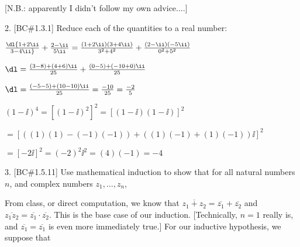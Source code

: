 \ssk

\item{} [N.B.: apparently I didn't follow my own advice....]

\bsk

\item{2.} [BC\#1.3.1] Reduce each of the quantities to a real number:

\msk


\msk

\item{} $\dl {{1+2\ii}\over{3-4\ii}}+{{2-\ii}\over{5\ii}} = 
{{(1+2\ii)(3+4\ii)}\over{3^2+4^2}}+{{(2-\ii)(-5\ii)}\over{0^2+5^2}}$

$\dl = 
{{(3-8)+(4+6)\ii}\over{25}}+{{(0-5)+(-10+0)\ii}\over{25}}$

$\dl = 
{{(-5-5)+(10-10)\ii}\over{25}} = {{-10}\over{25}} = {{-2}\over{5}}$

\msk

\item{} $(1-\ii)^4 = [(1-\ii)^2]^2 = [(1-\ii)(1-\ii)]^2$

$ = 
[((1)(1)-(-1)(-1))+((1)(-1)+(1)(-1))\ii]^2$

$ = [-2\ii]^2=(-2)^2\ii^2=(4)(-1)=-4$

\bsk

\item{3.} [BC\#1.5.11] Use mathematical induction to show that for all
natural numbers $n$, and complex numbers $z_1,\ldots,z_n$, 

\msk


\msk

\item{} From class, or direct computation, we know that $\overline{z_1+z_2} = \overline{z_1}+\overline{z_2}$
and $\overline{z_1z_2} = \overline{z_1}\cdot\overline{z_2}$. This is the base case of our
induction. [Technically, $n=1$ really is, and $\overline{z_1}=\overline{z_1}$ is even 
more immediately true.] For our inductive hypothesis, we suppose that

\ssk


